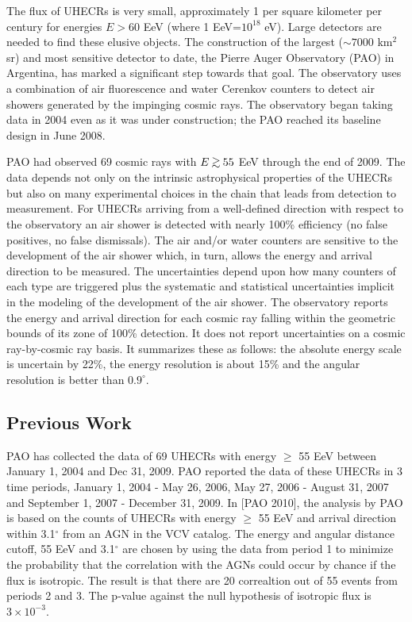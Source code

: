 \documentclass[dvips,aoas]{imsart}
\newcommand{\simgreat}[0]{\mathbin{\lower 3pt\hbox
   {$\rlap{\raise 5pt\hbox{$\char'076$}}\mathchar"7218$}}}
\newcommand{\gta}[0]{\simgreat}
\begin{document}
The flux of UHECRs is very small, approximately 1 per
square kilometer per century for energies $E>60$ EeV
(where 1 EeV=$10^{18}$ eV). Large detectors are needed
to find these elusive objects.  The construction of
the largest ($\sim 7000$ km$^2$ sr) and most sensitive
detector to date, the Pierre Auger Observatory (PAO) in
Argentina, has marked a significant step towards that
goal.  The observatory uses a combination of air
fluorescence and water Cerenkov counters to detect
air showers generated by the impinging cosmic rays. The
observatory began taking data in 2004 even as it was
under construction; the PAO reached its baseline design in
June 2008.

PAO had observed 69 cosmic rays with $E \gta 55$ EeV
through the end of 2009.  The data depends not only on
the intrinsic astrophysical properties of the UHECRs
but also on many experimental choices in the chain that
leads from detection to measurement. For UHECRs
arriving from a well-defined direction with respect to
the observatory an air shower is detected with nearly
100\% efficiency (no false positives, no false
dismissals).  The air and/or water counters are
sensitive to the development of the air shower which,
in turn, allows the energy and arrival direction to be
measured. The uncertainties depend upon how many
counters of each type are triggered plus the systematic
and statistical uncertainties implicit in the modeling
of the development of the air shower. The observatory
reports the energy and arrival direction for each
cosmic ray falling within the geometric bounds of its
zone of 100\% detection.  It does not report
uncertainties on a cosmic ray-by-cosmic ray basis. It
summarizes these as follows: the absolute energy scale
is uncertain by 22\%, the energy resolution is about
15\% and the angular resolution is better than
$0.9^\circ$.

\subsection{Previous Work}
PAO has collected the data of 69 UHECRs with energy $\geq$ 55 EeV between
January 1, 2004 and Dec 31, 2009. PAO reported the data of these UHECRs in
3 time periods, January 1, 2004 - May 26, 2006, May 27, 2006 - August 31, 2007
and September 1, 2007 - December 31, 2009. In [PAO 2010], the analysis by PAO
is based on the counts of UHECRs with energy $\geq$ 55 EeV and arrival direction
within 3.1$^\circ$ from an AGN in the VCV catalog. The energy and angular distance
cutoff, 55 EeV and 3.1$^\circ$ are chosen by using the data from period 1 to
minimize the probability that the correlation with the AGNs could occur by chance if
the flux is isotropic. The result is that there are 20 correaltion out of 55 events from
periods 2 and 3. The p-value against the null hypothesis of isotropic flux is $3\times 10^{-3}$.
\end{document}

